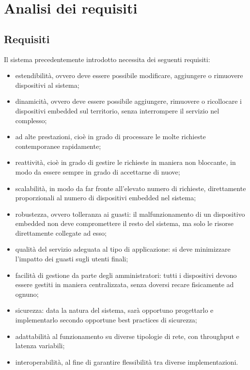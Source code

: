 \chapter{Analisi dei requisiti}

\section{Requisiti}

Il sistema precedentemente introdotto necessita dei seguenti requisiti:
\begin{itemize}
 \item estendibilità, ovvero deve essere possibile modificare, aggiungere o rimuovere dispositivi al sistema;
 \item dinamicità, ovvero deve essere possibile aggiungere, rimuovere o ricollocare i dispositivi embedded sul territorio, senza interrompere il servizio nel complesso;
 \item ad alte prestazioni, cioè in grado di processare le molte richieste contemporanee rapidamente;
 \item reattività, cioè in grado di gestire le richieste in maniera non bloccante, in modo da essere sempre in grado di accettarne di nuove;
 \item scalabilità, in modo da far fronte all’elevato numero di richieste, direttamente proporzionali al numero di dispositivi embedded nel sistema;
 \item robustezza, ovvero tolleranza ai guasti: il malfunzionamento di un dispositivo embedded non deve compromettere il resto del sistema, ma solo le risorse direttamente collegate ad esso;
 \item qualità del servizio adeguata al tipo di applicazione: si deve minimizzare l'impatto dei guasti sugli utenti finali;
 \item facilità di gestione da parte degli amministratori: tutti i dispositivi devono essere gestiti in maniera centralizzata, senza doversi recare fisicamente ad ognuno;
 \item sicurezza: data la natura del sistema, sarà opportuno progettarlo e implementarlo secondo opportune best practices di sicurezza;
 \item adattabilità al funzionamento su diverse tipologie di rete, con throughput e latenza variabili;
 \item interoperabilità, al fine di garantire flessibilità tra diverse implementazioni.
\end{itemize}


